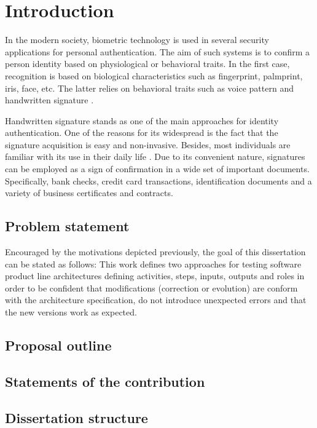 
\chapter{Introduction}
In the modern society, biometric technology is used in several security applications for personal authentication. The aim of such systems is to confirm a person identity based on physiological or behavioral traits. In the first case, recognition is based on biological characteristics such as fingerprint, palmprint, iris, face, etc. The latter relies on behavioral traits such as voice pattern and handwritten signature \cite{jain2004biometrics}.

Handwritten signature stands as one of the main approaches for identity authentication. One of the reasons for its widespread is the fact that the signature acquisition is easy and non-invasive. Besides, most individuals are familiar with its use in their daily life \cite{impedovo2008state}. Due to its convenient nature, signatures can be employed as a sign of confirmation in a wide set of important documents. Specifically, bank checks, credit card transactions, identification documents and a variety of business certificates and contracts.

\section{Problem statement}
Encouraged by the motivations depicted previously, the goal of this dissertation can be stated as follows:
This work defines two approaches for testing software product line architectures defining activities, steps, inputs, outputs and roles in order to be confident that modifications
(correction or evolution) are conform with the architecture specification, do not introduce unexpected errors and that the new versions work as expected.

\section{Proposal outline}

\section{Statements of the contribution}

\section{Dissertation structure}




